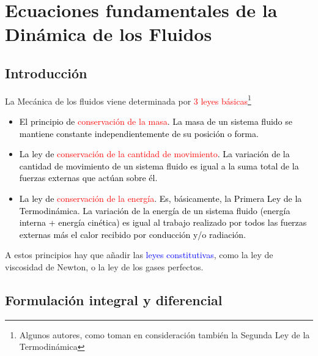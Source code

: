 \chapter[Ecuaciones de la Dinámica]{Ecuaciones fundamentales de la Dinámica de los Fluidos}
\section{Introducción}
	
	La Mecánica de los fluidos viene determinada por \textcolor{red}{3
		leyes básicas}\footnote{Algunos autores, como \cite{Shames2003} toman en consideración también
		la Segunda Ley de la Termodinámica}
	
	\begin{itemize}
		\item \textcolor{black}{El principio de }\textcolor{red}{conservación de
			la masa}\textcolor{black}{. La masa de un sistema fluido se mantiene
			constante independientemente de su posición o forma. }
		\item \textcolor{black}{La ley de }\textcolor{red}{conservación de la cantidad
			de movimiento}\textcolor{black}{. La variación de la cantidad de movimiento
			de un sistema fluido es igual a la suma total de la fuerzas externas
			que actúan sobre él. }
		\item \textcolor{black}{La ley de }\textcolor{red}{conservación de la energía}\textcolor{black}{.
			Es, básicamente, la Primera Ley de la Termodinámica. La variación
			de la energía de un sistema fluido (energía interna + energía cinética)
			es igual al trabajo realizado por todos las fuerzas externas más el
			calor recibido por conducción y/o radiación. }
	\end{itemize}
	A estos principios hay que añadir las \textcolor{blue}{leyes constitutivas},
	como la ley de viscosidad de Newton, o la ley de los gases perfectos. 


\section{Formulación integral y diferencial}

